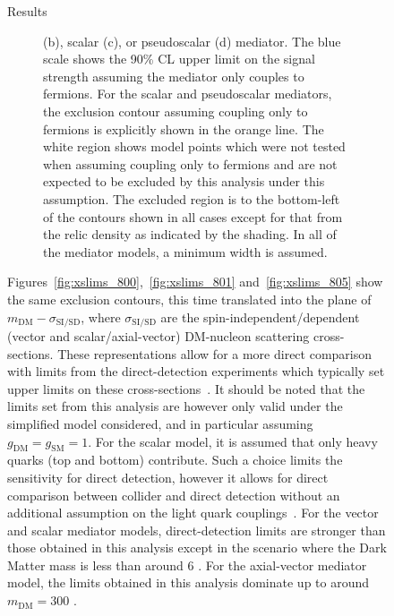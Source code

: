 \begin{figure}[hbtp]
\begin{section}{Results}
\begin{figure}[htbp]
{(b), scalar (c), or pseudoscalar (d) mediator.  The blue scale shows the 90\% CL
upper limit on the signal strength assuming the mediator only couples to
fermions. For the scalar and pseudoscalar mediators, the exclusion contour
assuming coupling only to fermions is explicitly shown in the orange line. The
white region shows model points which were not tested when assuming coupling
only to fermions and are not expected to be excluded by this analysis under this
assumption.  The excluded region is to the bottom-left of the contours shown in
all cases except for that from the relic density as indicated by the shading.
In all of the mediator models, a minimum width is assumed\label{fig:masslims}.}
\end{figure}

Figures~\ref{fig:xslims_800},~\ref{fig:xslims_801} and~\ref{fig:xslims_805} show
the same exclusion contours, this time translated into the plane of
$m_{\textrm{DM}}-\sigma_{\textrm{SI/SD}}$, where $\sigma_{\textrm{SI/SD}}$ are
the spin-independent/dependent (vector and scalar/axial-vector) DM-nucleon
scattering cross-sections. These representations allow for a more direct
comparison with limits from the direct-detection experiments which typically set
upper limits on these cross-sections~\cite{ Malik:2014ggr,Harris:2015kda}. It
should be noted that the limits set from this analysis are however only valid
under the simplified model considered, and in particular assuming
$g_{\textrm{DM}}=g_{\textrm{SM}}=1$. For the scalar model, it is assumed that
only heavy quarks (top and bottom) contribute. Such a choice limits the
sensitivity for direct detection, however it allows for direct comparison
between collider and direct detection without an additional assumption on the
light quark couplings~\cite{Harris:2015kda}.  For the vector and scalar mediator
models, direct-detection limits are stronger than those obtained in this
analysis except in the scenario where the Dark Matter mass is less than around 6
\GeV. For the axial-vector mediator model, the limits obtained in this analysis
dominate up to around $m_{\mathrm{DM}}=300$ \GeV. 
 

\end{section}
\end{figure}
